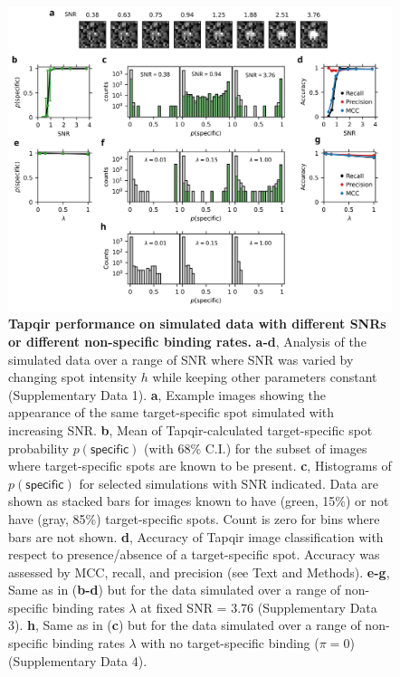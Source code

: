 \begin{figure}[h]
\centering
\includegraphics[width=1\textwidth]{figures/figure5/figure5.png}
\caption{\textbf{Tapqir performance on simulated data with different SNRs or different non-specific binding rates.} \textbf{a-d}, Analysis of the simulated data over a range of SNR where SNR was varied by changing spot intensity  $h$ while keeping other parameters constant (Supplementary Data 1). \textbf{a}, Example images showing the appearance of the same target-specific spot simulated with increasing SNR.   \textbf{b}, Mean of Tapqir-calculated target-specific spot probability $p(\mathsf{specific})$ (with 68\% C.I.) for the subset of images where target-specific spots  are known to be present. \textbf{c}, Histograms of $p(\mathsf{specific})$ for selected simulations with SNR indicated. Data are shown as stacked bars for images known to have (green, 15\%) or not have (gray, 85\%) target-specific spots.  Count is zero for bins where bars are not shown. \textbf{d}, Accuracy of Tapqir image classification with respect to presence/absence of a target-specific spot. Accuracy was assessed by MCC, recall, and precision (see Text and Methods). \textbf{e-g}, Same as in (\textbf{b-d}) but for the data simulated over a range of non-specific binding rates $\lambda$ at fixed SNR = 3.76 (Supplementary Data 3). \textbf{h}, Same as in (\textbf{c}) but for the data simulated over a range of non-specific binding rates $\lambda$ with no target-specific binding ($\pi = 0$) (Supplementary Data 4).}
\label{fig:tapqir_performance}
\end{figure}


